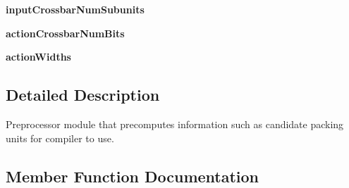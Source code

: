 \begin{DoxyCompactItemize}
\item 
\hypertarget{classmapper_1_1src_1_1rmt_1_1rmt__preprocess_1_1_rmt_preprocess_a54e791f01724867bfd3324d00e317f87}{}{\bfseries input\+Crossbar\+Num\+Subunits}\label{classmapper_1_1src_1_1rmt_1_1rmt__preprocess_1_1_rmt_preprocess_a54e791f01724867bfd3324d00e317f87}

\item 
\hypertarget{classmapper_1_1src_1_1rmt_1_1rmt__preprocess_1_1_rmt_preprocess_a7c2c57fb6de38d1a793c29628de010bc}{}{\bfseries action\+Crossbar\+Num\+Bits}\label{classmapper_1_1src_1_1rmt_1_1rmt__preprocess_1_1_rmt_preprocess_a7c2c57fb6de38d1a793c29628de010bc}

\item 
\hypertarget{classmapper_1_1src_1_1rmt_1_1rmt__preprocess_1_1_rmt_preprocess_accf7094df523fd08a065b4e6ea7c22c8}{}{\bfseries action\+Widths}\label{classmapper_1_1src_1_1rmt_1_1rmt__preprocess_1_1_rmt_preprocess_accf7094df523fd08a065b4e6ea7c22c8}

\end{DoxyCompactItemize}


\subsection{Detailed Description}
\begin{DoxyVerb}Preprocessor module that precomputes information such as candidate packing units
for compiler to use.
\end{DoxyVerb}
 

\subsection{Member Function Documentation}
\hypertarget{classmapper_1_1src_1_1rmt_1_1rmt__preprocess_1_1_rmt_preprocess_a4bfd6f429acb6f63243f1a018f4d54af}{}
